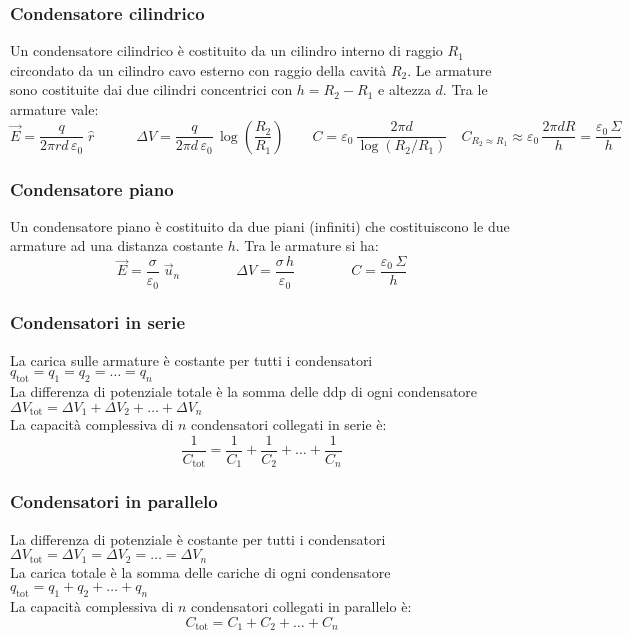 \documentclass[a4paper]{article}
\newcommand\un{\vec{u}_n}
\begin{document}
\subsubsection*{Condensatore cilindrico}
Un condensatore cilindrico è costituito da un cilindro interno di raggio \(R_1\) circondato da un cilindro cavo esterno con raggio
della cavità \(R_2\). Le armature sono costituite dai due cilindri concentrici con \(h = R_2 - R_1\) e altezza \(d\). Tra le armature vale:
\[\vec{E} = \frac{q}{2 \pi r d \, \varepsilon_0} \; \hat{r} \qquad \quad \Delta V = \frac{q}{2 \pi d \, \varepsilon_0} \, \log \left(\frac{R_2}{R_1}\right) \qquad C = \varepsilon_0 \, \frac{2 \pi d}{\log \left(R_2 / R_1\right)} \quad C_{R_2 \approx R_1} \approx \varepsilon_0 \, \frac{2 \pi d R}{h} = \frac{\varepsilon_0 \, \Sigma}{h}\]

\subsubsection*{Condensatore piano}
Un condensatore piano è costituito da due piani (infiniti) che costituiscono le due armature ad una distanza costante \(h\). Tra le armature si ha:
\[\vec{E} = \frac{\sigma}{\varepsilon_0} \; \un \qquad \qquad \Delta V = \frac{\sigma \, h}{\varepsilon_0} \qquad \qquad C = \frac{\varepsilon_0 \, \Sigma}{h}\]

\subsubsection*{Condensatori in serie}
La carica sulle armature è costante per tutti i condensatori \(q_\text{tot} = q_1 = q_2 = \dots = q_n\) \\
La differenza di potenziale totale è la somma delle ddp di ogni condensatore \(\Delta V_\text{tot} = \Delta V_1 + \Delta V_2 + \dots + \Delta V_n\) \\
La capacità complessiva di \(n\) condensatori collegati in serie è:
\[\frac{1}{C_\text{tot}} = \frac{1}{C_1} + \frac{1}{C_2} + \dots + \frac{1}{C_n}\]

\subsubsection*{Condensatori in parallelo}
La differenza di potenziale è costante per tutti i condensatori \(\Delta V_\text{tot} = \Delta V_1 = \Delta V_2 = \dots = \Delta V_n\) \\
La carica totale è la somma delle cariche di ogni condensatore \(q_\text{tot} = q_1 + q_2 + \dots + q_n\) \\
La capacità complessiva di \(n\) condensatori collegati in parallelo è:
\[C_\text{tot} = C_1 + C_2 + \dots + C_n\]
\end{document}
